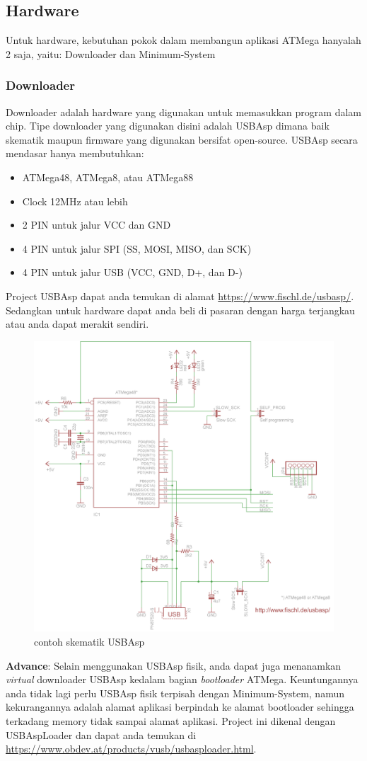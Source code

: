 \documentclass[12pt,]{article}
\begin{document}
	\subsection{Hardware}
	
	Untuk hardware, kebutuhan pokok dalam membangun aplikasi ATMega hanyalah 2 saja, yaitu: Downloader dan Minimum-System 
	
	\subsubsection{Downloader}
	Downloader adalah hardware yang digunakan untuk memasukkan program dalam chip.
	Tipe downloader yang digunakan disini adalah USBAsp dimana baik skematik maupun firmware yang digunakan bersifat open-source.
	USBAsp secara mendasar hanya membutuhkan:
	\begin{itemize}
		\item ATMega48, ATMega8, atau ATMega88
		\item Clock 12MHz atau lebih
		\item 2 PIN untuk jalur VCC dan GND
		\item 4 PIN untuk jalur SPI (SS, MOSI, MISO, dan SCK)
		\item 4 PIN untuk jalur USB (VCC, GND, D+, dan D-)
	\end{itemize}
	Project USBAsp dapat anda temukan di alamat \url{https://www.fischl.de/usbasp/}.
	Sedangkan untuk hardware dapat anda beli di pasaran dengan harga terjangkau atau anda dapat merakit sendiri.
	\begin{figure}[H]
		\centering
		\includegraphics[width=0.6\linewidth]{images/usbasp}
		\caption{contoh skematik USBAsp}
	\end{figure}

	\textbf{Advance}: Selain menggunakan USBAsp fisik, anda dapat juga menanamkan \textit{virtual} downloader USBAsp kedalam bagian \textit{bootloader} ATMega.
	Keuntungannya anda tidak lagi perlu USBAsp fisik terpisah dengan Minimum-System,
	namun kekurangannya adalah alamat aplikasi berpindah ke alamat bootloader sehingga terkadang memory tidak sampai alamat aplikasi.
	Project ini dikenal dengan USBAspLoader dan dapat anda temukan di \url{https://www.obdev.at/products/vusb/usbasploader.html}.
	
\end{document}

